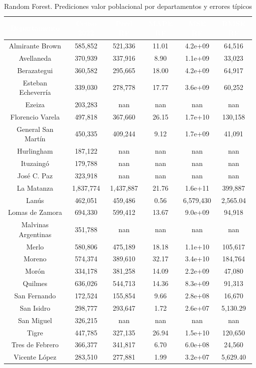 \documentclass{article}
\theoremstyle{mytheoremstyle}
\theoremstyle{mytheoremstyle}
\theoremstyle{myproblemstyle}
\begin{document}
\begin{table}[htb!]
  \centering
  \begin{tabular}{|c|c|c|c|c|c|}
  \hline
  \textbf{\cellcolor[rgb]{0,0.231,0.427}\textcolor{white}{Departamento}} & \textbf{\cellcolor[rgb]{0,0.231,0.427}\textcolor{white}{Censo 2022}} & \textbf{\cellcolor[rgb]{0,0.231,0.427}\textcolor{white}{Pred RF}} & \textbf{\cellcolor[rgb]{0,0.231,0.427}\textcolor{white}{MAPE RF}} & \textbf{\cellcolor[rgb]{0,0.231,0.427}\textcolor{white}{MSE RF}} & \textbf{\cellcolor[rgb]{0,0.231,0.427}\textcolor{white}{RMSE RF}} \\ \hline
  Almirante Brown & 585,852 & 521,336 & 11.01 & 4.2e+09 & 64,516 \\
  Avellaneda & 370,939 & 337,916 & 8.90 & 1.1e+09 & 33,023 \\
  Berazategui & 360,582 & 295,665 & 18.00 & 4.2e+09 & 64,917 \\
  Esteban Echeverría & 339,030 & 278,778 & 17.77 & 3.6e+09 & 60,252 \\
  Ezeiza & 203,283 & nan & nan & nan & nan \\
  Florencio Varela & 497,818 & 367,660 & 26.15 & 1.7e+10 & 130,158 \\
  General San Martín & 450,335 & 409,244 & 9.12 & 1.7e+09 & 41,091 \\
  Hurlingham & 187,122 & nan & nan & nan & nan \\
  Ituzaingó & 179,788 & nan & nan & nan & nan \\
  José C. Paz & 323,918 & nan & nan & nan & nan \\
  La Matanza & 1,837,774 & 1,437,887 & 21.76 & 1.6e+11 & 399,887 \\
  Lanús & 462,051 & 459,486 & 0.56 & 6,579,430 & 2,565.04 \\
  Lomas de Zamora & 694,330 & 599,412 & 13.67 & 9.0e+09 & 94,918 \\
  Malvinas Argentinas & 351,788 & nan & nan & nan & nan \\
  Merlo & 580,806 & 475,189 & 18.18 & 1.1e+10 & 105,617 \\
  Moreno & 574,374 & 389,610 & 32.17 & 3.4e+10 & 184,764 \\
  Morón & 334,178 & 381,258 & 14.09 & 2.2e+09 & 47,080 \\
  Quilmes & 636,026 & 544,713 & 14.36 & 8.3e+09 & 91,313 \\
  San Fernando & 172,524 & 155,854 & 9.66 & 2.8e+08 & 16,670 \\
  San Isidro & 298,777 & 293,647 & 1.72 & 2.6e+07 & 5,130.29 \\
  San Miguel & 326,215 & nan & nan & nan & nan \\
  Tigre & 447,785 & 327,135 & 26.94 & 1.5e+10 & 120,650 \\
  Tres de Febrero & 366,377 & 341,817 & 6.70 & 6.0e+08 & 24,560 \\
  Vicente López & 283,510 & 277,881 & 1.99 & 3.2e+07 & 5,629.40 \\
  \hline
  \end{tabular}
  \caption{Random Forest. Prediciones valor poblacional por departamentos y errores típicos}
  \label{tab:RFresults}
\end{table}
  
\end{document}

